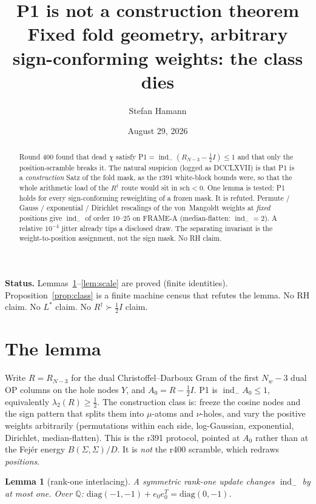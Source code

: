 \documentclass[11pt]{article}
\title{\bfseries P1 is not a construction theorem\\[2mm]
\large Fixed fold geometry, arbitrary sign-conforming weights:
the class dies}
\author{Stefan Hamann}
\date{August 29, 2026}
\newtheorem{lemma}{Lemma}
\theoremstyle{remark}
\newcommand{\indm}{\operatorname{ind}_{-}}
\newcommand{\half}{\tfrac12}
\begin{document}
\maketitle

\begin{abstract}\noindent
Round 400 found that dead $\chi$ satisfy
P1${}={}\indm(R_{N-3}-\half I)\le 1$ and that only the
position-scramble breaks it.
The natural suspicion (logged as DCCLXVII) is that P1 is a
\emph{construction} Satz of the fold mask, as the r391
white-block bounds were, so that the whole arithmetic load of
the $R^\dagger$ route would sit in $\mathrm{sch}<0$.
One lemma is tested: P1 holds for every sign-conforming
reweighting of a frozen mask.
It is refuted.
Permute / Gauss / exponential / Dirichlet rescalings of the
von~Mangoldt weights at \emph{fixed} positions give
$\indm$ of order $10$--$25$ on FRAME-A (median-flatten:
$\indm=2$).
A relative $10^{-4}$ jitter already tips a disclosed draw.
The separating invariant is the weight-to-position assignment,
not the sign mask.
No RH claim.
\end{abstract}

\medskip\noindent
\textbf{Status.}\enspace
Lemmas~\ref{lem:interlace}--\ref{lem:scale} are proved
(finite identities).
Proposition~\ref{prop:class} is a finite machine census
that refutes the lemma.
No RH claim.  No $L^*$ claim.  No $R^\dagger\succ\half I$ claim.

\section{The lemma}\label{sec:lem}

Write $R=R_{N-3}$ for the dual Christoffel--Darboux Gram of
the first $N_w-3$ dual OP columns on the hole nodes $Y$, and
$A_0=R-\half I$.
P1 is $\indm A_0\le 1$, equivalently $\lambda_2(R)\ge\half$.
The construction class is: freeze the cosine nodes and the
sign pattern that splits them into $\mu$-atoms and
$\nu$-holes, and vary the positive weights arbitrarily
(permutations within each side, log-Gaussian, exponential,
Dirichlet, median-flatten).
This is the r391 protocol, pointed at $A_0$ rather than at
the Fej\'er energy $B(\Sigma,\Sigma)/D$.
It is \emph{not} the r400 scramble, which redraws
\emph{positions}.

\begin{lemma}[rank-one interlacing]\label{lem:interlace}
A symmetric rank-one update changes $\indm$ by at most one.
Over $\mathbb{Q}$:
$\mathrm{diag}(-1,-1)+e_0 e_0^T=\mathrm{diag}(0,-1)$.
\end{lemma}
\end{document}
